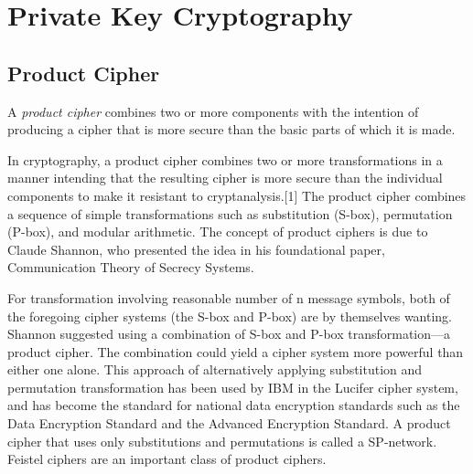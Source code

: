 \section{Private Key Cryptography}

\subsection{Product Cipher}
\begin{definition}
    A \textit{product cipher} combines two or more components with the intention of producing a cipher that is more secure than the basic parts of which it is made.

    In cryptography, a product cipher combines two or more transformations in a manner intending that the resulting cipher is more secure than the individual components to make it resistant to cryptanalysis.[1] The product cipher combines a sequence of simple transformations such as substitution (S-box), permutation (P-box), and modular arithmetic. The concept of product ciphers is due to Claude Shannon, who presented the idea in his foundational paper, Communication Theory of Secrecy Systems.

    For transformation involving reasonable number of n message symbols, both of the foregoing cipher systems (the S-box and P-box) are by themselves wanting. Shannon suggested using a combination of S-box and P-box transformation—a product cipher. The combination could yield a cipher system more powerful than either one alone. This approach of alternatively applying substitution and permutation transformation has been used by IBM in the Lucifer cipher system, and has become the standard for national data encryption standards such as the Data Encryption Standard and the Advanced Encryption Standard. A product cipher that uses only substitutions and permutations is called a SP-network. Feistel ciphers are an important class of product ciphers.
\end{definition}

